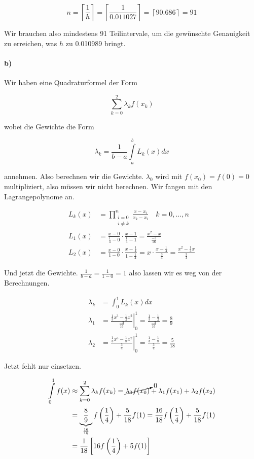 \documentclass[ngerman,a4paper]{scrartcl}
\begin{document}
\[
n = \left\lceil \frac{1}{h} \right\rceil = \left\lceil \frac{1}{0.011027} \right\rceil = \left\lceil 90.686 \right\rceil = 91
\]

Wir brauchen also mindestens 91 Teilintervale, um die gewünschte Genauigkeit zu erreichen, was $h$ zu 0.010989 bringt.

\paragraph{b)}

Wir haben eine Quadraturformel der Form

\[
\sum^2_{k=0} \lambda_k f(x_k)
\]

wobei die Gewichte die Form

\[
\lambda_k = \frac{1}{b-a} \int\limits^b_a L_k(x) dx
\]

annehmen. Also berechnen wir die Gewichte. $\lambda_0$ wird mit $f(x_0) = f(0) = 0$ multipliziert, also müssen wir nicht berechnen. Wir fangen mit den Lagrangepolynome an.

\begin{align*}
  L_k(x) &= \prod^n_{\substack{i=0\\i\neq k}} \frac{x - x_i}{x_k-x_i}         \quad k = 0,\dots,n\\
L_1(x) &= \frac{x - 0}{\frac{1}{4} - 0} \cdot \frac{x - 1}{\frac{1}{4} -1} = \frac{x^2 - x}{\frac{-3}{16}}\\
L_2(x) &= \frac{x-0}{1 - 0}\cdot \frac{x - \frac{1}{4}}{1 - \frac{1}{4}} = x \cdot \frac{x - \frac{1}{4}}{\frac{3}{4}} = \frac{x^2 - \frac{1}{4}x}{\frac{3}{4}}
\end{align*}

Und jetzt die Gewichte. $\frac{1}{b-a} = \frac{1}{1-0} = 1$ also lassen wir es weg von der Berechnungen.

\begin{align*}
  \lambda_k &= \int_0^1 L_k(x) dx\\
  \lambda_1 &= \left.\frac{\frac{1}{3}x^3 - \frac{1}{2} x^2}{\frac{-3}{16}}\right|_0^1 = \frac{\frac{1}{3} - \frac{1}{2}}{\frac{-3}{16}} = \frac{8}{9}\\
\lambda_2 &= \left. \frac{\frac{1}{3}x^3 - \frac{1}{8}x^2}{\frac{3}{4}} \right|_0^1 = \frac{\frac{1}{3}-\frac{1}{8}}{\frac{3}{4}} = \frac{5}{18}
\end{align*}

Jetzt fehlt nur einsetzen.

\begin{align*}
  \int\limits_0^1 f(x) &\approx \sum^2_{k=0} \lambda_k f(x_k) = \cancelto{0}{\lambda_0 f(x_0)} + \lambda_1 f(x_1) + \lambda_2 f(x_2)\\
&= \underbrace{\frac{8}{9}}_{\frac{16}{18}} f\left(\frac{1}{4}\right) + \frac{5}{18} f(1) = \frac{16}{18} f\left(\frac{1}{4}\right) + \frac{5}{18} f(1)\\
&= \frac{1}{18}\left[ 16 f\left(\frac{1}{4}\right) + 5 f(1) \right]
\end{align*}
\end{document}
